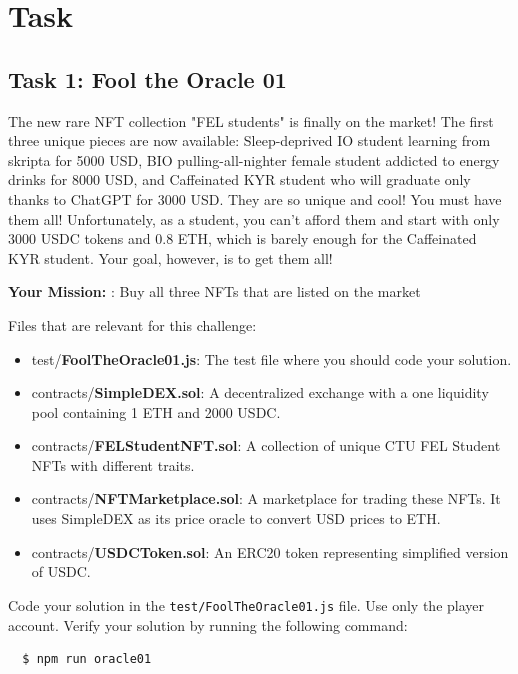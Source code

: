 \documentclass[12pt]{article}
\begin{document}
\section{Task}

\subsection*{Task 1: Fool the Oracle 01}

The new rare NFT collection "FEL students" is finally on the market! The first three unique pieces are now available: Sleep-deprived IO student learning from skripta for 5000 USD, BIO pulling-all-nighter female student addicted to energy drinks for 8000 USD, and Caffeinated KYR student who will graduate only thanks to ChatGPT for 3000 USD. They are so unique and cool! You must have them all! Unfortunately, as a student, you can't afford them and start with only 3000 USDC tokens and 0.8 ETH, which is barely enough for the Caffeinated KYR student. Your goal, however, is to get them all!

\medskip
\noindent
\textbf{Your Mission:} : Buy all three NFTs that are listed on the market

\noindent
Files that are relevant for this challenge:

\begin{itemize}
\item test/\textbf{FoolTheOracle01.js}: The test file where you should code your solution.
\item contracts/\textbf{SimpleDEX.sol}: A decentralized exchange with a one liquidity pool containing 1 ETH and 2000 USDC.
\item contracts/\textbf{FELStudentNFT.sol}: A collection of unique CTU FEL Student NFTs with different traits.
\item contracts/\textbf{NFTMarketplace.sol}: A marketplace for trading these NFTs. It uses SimpleDEX as its price oracle to convert USD prices to ETH.
\item contracts/\textbf{USDCToken.sol}: An ERC20 token representing simplified version of USDC.
\end{itemize}

\noindent
Code your solution in the \texttt{test/FoolTheOracle01.js} file. Use only the player account. Verify your solution by running the following command:

\begin{verbatim}
  $ npm run oracle01
\end{verbatim}
\end{document}
